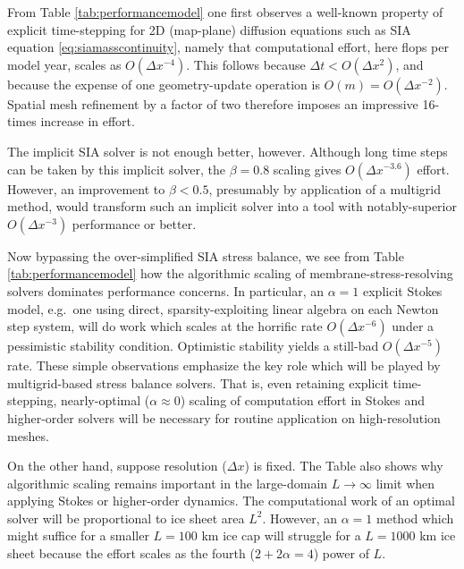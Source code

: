 \documentclass[review,letterpaper]{igs}
\begin{document}
From Table \ref{tab:performancemodel} one first observes a well-known property of explicit time-stepping for 2D (map-plane) diffusion equations such as SIA equation \eqref{eq:siamasscontinuity}, namely that computational effort, here flops per model year, scales as $O(\Delta x^{-4})$.  This follows because $\Delta t < O(\Delta x^2)$, and because the expense of one geometry-update operation is $O(m) = O(\Delta x^{-2})$.  Spatial mesh refinement by a factor of two therefore imposes an impressive 16-times increase in effort.

The \cite{Bueler2016} implicit SIA solver is not enough better, however.  Although long time steps can be taken by this implicit solver, the $\beta=0.8$ scaling gives $O(\Delta x^{-3.6})$ effort.  However, an improvement to $\beta < 0.5$, presumably by application of a multigrid method, would transform such an implicit solver into a tool with notably-superior $O(\Delta x^{-3})$ performance or better.

Now bypassing the over-simplified SIA stress balance, we see from Table \ref{tab:performancemodel} how the algorithmic scaling of membrane-stress-resolving solvers dominates performance concerns.  In particular, an $\alpha=1$ explicit Stokes model, e.g.~one using direct, sparsity-exploiting linear algebra on each Newton step system, will do work which scales at the horrific rate $O(\Delta x^{-6})$ under a pessimistic stability condition.  Optimistic stability yields a still-bad $O(\Delta x^{-5})$ rate.  These simple observations emphasize the key role which will be played by multigrid-based stress balance solvers.  That is, even retaining explicit time-stepping, nearly-optimal ($\alpha \approx 0$) scaling of computation effort in Stokes and higher-order solvers will be necessary for routine application on high-resolution meshes.

On the other hand, suppose resolution ($\Delta x$) is fixed.  The Table also shows why algorithmic scaling remains important in the large-domain $L\to\infty$ limit when applying Stokes or higher-order dynamics.  The computational work of an optimal solver will be proportional to ice sheet area $L^2$.  However, an $\alpha=1$ method which might suffice for a smaller $L=100$ km ice cap will struggle for a $L=1000$ km ice sheet because the effort scales as the fourth ($2+2\alpha=4$) power of $L$.
\end{document}
